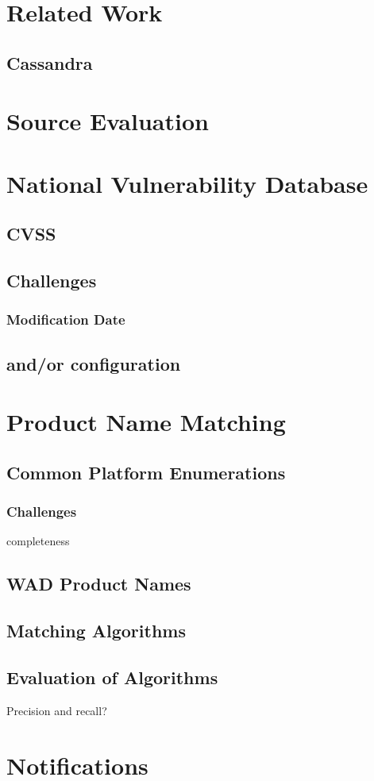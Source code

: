 \section{Related Work}
\subsection{Cassandra}

\section{Source Evaluation}

\section{National Vulnerability Database}
\subsection{CVSS}
\subsection{Challenges}
\subsubsection{Modification Date}
\subsection{and/or configuration}

\section{Product Name Matching}
\subsection{Common Platform Enumerations}
\subsubsection{Challenges}
completeness
\subsection{WAD Product Names}
\subsection{Matching Algorithms}
\subsection{Evaluation of Algorithms}
Precision and recall?
\section{Notifications}




